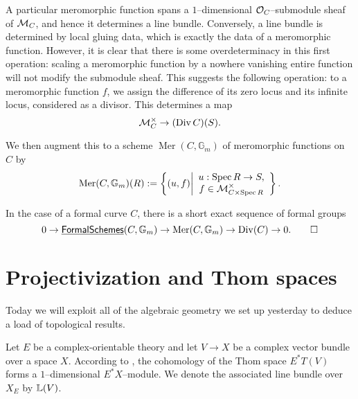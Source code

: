 A particular meromorphic function spans a $1$--dimensional $\mathcal{O}_C$--submodule sheaf of $\mathcal{M}_C$, and hence it determines a line bundle.  Conversely, a line bundle is determined by local gluing data, which is exactly the data of a meromorphic function.  However, it is clear that there is some overdeterminacy in this first operation: scaling a meromorphic function by a nowhere vanishing entire function will not modify the submodule sheaf.  This suggests the following operation: to a meromorphic function $f$, we assign the difference of its zero locus and its infinite locus, considered as a divisor.  This determines a map \[\mathcal{M}_C^\times \to (\operatorname{Div} C)(S).\]

\begin{definition}
We then augment this to a scheme $\operatorname{Mer}(C, \mathbb G_m)$ of meromorphic functions on $C$ by \[\operatorname{Mer}(C, \mathbb G_m)(R) := \left\{ (u, f) \middle| \begin{array}{c} u: \operatorname{Spec} R \to S, \\ f \in \mathcal{M}^\times_{C \times \operatorname{Spec} R} \end{array} \right\}.\]
\end{definition}

\begin{theorem}
In the case of a formal curve $C$, there is a short exact sequence of formal groups \[0 \to \operatorname{\underline{\smash{\mathsf{FormalSchemes}}}}(C, \mathbb G_m) \to \operatorname{Mer}(C, \mathbb G_m) \to \operatorname{Div}(C) \to 0. \qed\]
\end{theorem}







\section{Projectivization and Thom spaces}

Today we will exploit all of the algebraic geometry we set up yesterday to deduce a load of topological results.  

\begin{definition}
Let $E$ be a complex-orientable theory and let $V \to X$ be a complex vector bundle over a space $X$.  According to , the cohomology of the Thom space $E^* T(V)$ forms a $1$--dimensional $E^* X$--module.  We denote the associated line bundle over $X_E$ by $\mathbb{L}(V)$.
\end{definition}

